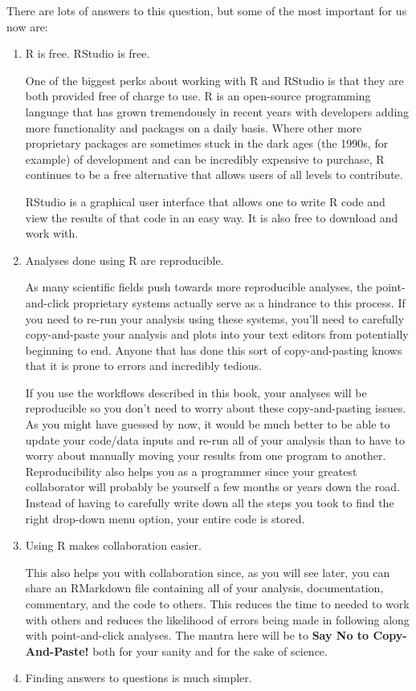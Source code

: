 \documentclass[]{tufte-book}
\begin{document}
There are lots of answers to this question, but some of the most
important for us now are:

\begin{enumerate}
\def\labelenumi{\arabic{enumi}.}
\item
  R is free. RStudio is free.

  One of the biggest perks about working with R and RStudio is that they
  are both provided free of charge to use. R is an open-source
  programming language that has grown tremendously in recent years with
  developers adding more functionality and packages on a daily basis.
  Where other more proprietary packages are sometimes stuck in the dark
  ages (the 1990s, for example) of development and can be incredibly
  expensive to purchase, R continues to be a free alternative that
  allows users of all levels to contribute.

  RStudio is a graphical user interface that allows one to write R code
  and view the results of that code in an easy way. It is also free to
  download and work with.
\item
  Analyses done using R are reproducible.

  As many scientific fields push towards more reproducible analyses, the
  point-and-click proprietary systems actually serve as a hindrance to
  this process. If you need to re-run your analysis using these systems,
  you'll need to carefully copy-and-paste your analysis and plots into
  your text editors from potentially beginning to end. Anyone that has
  done this sort of copy-and-pasting knows that it is prone to errors
  and incredibly tedious.

  If you use the workflows described in this book, your analyses will be
  reproducible so you don't need to worry about these copy-and-pasting
  issues. As you might have guessed by now, it would be much better to
  be able to update your code/data inputs and re-run all of your
  analysis than to have to worry about manually moving your results from
  one program to another. Reproducibility also helps you as a programmer
  since your greatest collaborator will probably be yourself a few
  months or years down the road. Instead of having to carefully write
  down all the steps you took to find the right drop-down menu option,
  your entire code is stored.
\item
  Using R makes collaboration easier.

  This also helps you with collaboration since, as you will see later,
  you can share an RMarkdown file containing all of your analysis,
  documentation, commentary, and the code to others. This reduces the
  time to needed to work with others and reduces the likelihood of
  errors being made in following along with point-and-click analyses.
  The mantra here will be to \textbf{Say No to Copy-And-Paste!} both for
  your sanity and for the sake of science.
\item
  Finding answers to questions is much simpler.


\end{enumerate}
\end{document}

